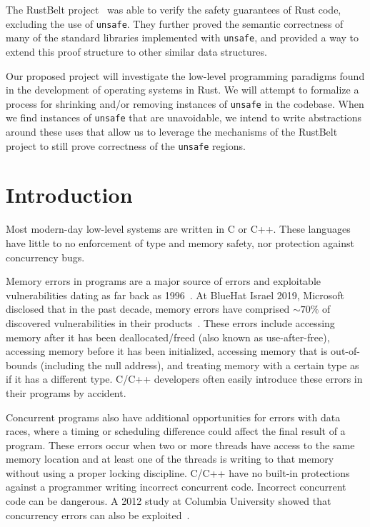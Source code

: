 \documentclass[12pt]{article}
\begin{document}
The RustBelt project~\cite{jung2017rustbelt} was able to verify the safety guarantees of Rust code, excluding the use of \texttt{unsafe}. They further proved the semantic correctness of many of the standard libraries implemented with \texttt{unsafe}, and provided a way to extend this proof structure to other similar data structures.

Our proposed project will investigate the low-level programming paradigms found in the development of operating systems in Rust. We will attempt to formalize a process for shrinking and/or removing instances of \texttt{unsafe} in the codebase. When we find instances of \texttt{unsafe} that are unavoidable, we intend to write abstractions around these uses that allow us to leverage the mechanisms of the RustBelt project to still prove correctness of the \texttt{unsafe} regions.


\section{Introduction}
Most modern-day low-level systems are written in C or C++. These languages have little to no enforcement of type and memory safety, nor protection against concurrency bugs.

Memory errors in programs are a major source of errors and exploitable vulnerabilities dating as far back as 1996~\cite{one1996smashing}. At BlueHat Israel 2019, Microsoft disclosed that in the past decade, memory errors have comprised $\sim70\%$ of discovered vulnerabilities in their products~\cite{miller2019trends}. These errors include accessing memory after it has been deallocated/freed (also known as use-after-free), accessing memory before it has been initialized, accessing memory that is out-of-bounds (including the null address), and treating memory with a certain type as if it has a different type. C/C++ developers often easily introduce these errors in their programs by accident.

Concurrent programs also have additional opportunities for errors with data races, where a timing or scheduling difference could affect the final result of a program. These errors occur when two or more threads have access to the same memory location and at least one of the threads is writing to that memory without using a proper locking discipline. C/C++ have no built-in protections against a programmer writing incorrect concurrent code. Incorrect concurrent code can be dangerous. A 2012 study at Columbia University showed that concurrency errors can also be exploited~\cite{yang2012concurrency}.
\end{document}
